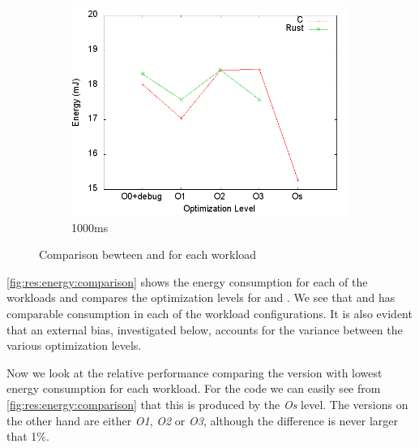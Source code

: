\begin{figure}[H]
  \begin{subfigure}{0.40\textwidth}
    \includegraphics[width=\textwidth]{results/plots/energy/1000.png}
    \caption{1000ms}
  \end{subfigure}

  \caption{Comparison bewteen {\rust} and {\C} for each workload}
  \label{fig:res:energy:comparison}
\end{figure}

\autoref{fig:res:energy:comparison} shows the energy consumption for each of the workloads and compares the optimization levels for {\rust} and {\C}.
We see that {\rust} and {\C} has comparable consumption in each of the workload configurations.
It is also evident that an external bias, investigated below, accounts for the variance between the various optimization levels.

Now we look at the relative performance comparing the version with lowest energy consumption for each workload.
For the {\C} code we can easily see from \autoref{fig:res:energy:comparison} that this is produced by the \emph{Os} level.
The {\rust} versions on the other hand are either \emph{O1}, \emph{O2} or \emph{O3}, although the difference is never larger that 1\%.

